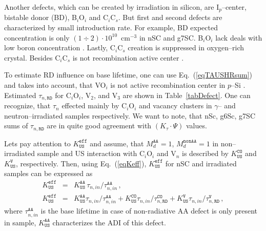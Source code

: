 \documentclass[aip,jap, amsmath,amssymb,reprint]{revtex4-1}
\begin{document}
Another defects, which can be created by irradiation in silicon, are I$_p$--center, bistable donor (BD), B$_i$O$_i$ and C$_i$C$_s$.
But first and second defects are characterized by small introduction rate.
For example, BD expected\cite{n:gamma,BD:Fret} concentration is only $(1\div2)\cdot10^{10}$~cm$^{-3}$ in nSC and g7SC.
B$_i$O$_i$ lack deals with low boron concentration \cite{SiIntDef}.
Lastly,  C$_i$C$_s$ creation is suppressed in oxygen--rich crystal\cite{gamma:Kolk,gamma:Stahl,n:long}.
Besides C$_i$C$_s$ is not recombination active center \cite{CiCs:Song}.

To estimate RD influence on base lifetime, one can use Eq.~(\ref{eqTAUSHRsum})
and takes into account, that
VO$_i$ is not active recombination center in $p$--Si \cite{gamma:Kolkov,IrrCzpSi:Benton,IrrCzpSi:Coffa,IrrCzpSi:Ganagona,IrrCzpSi:Vines}.
Estimated $\tau_{n,\mathtt{RD}}$ for C$_i$O$_i$, V$_2$, and  V$_3$ are shown in Table~\ref{tabDefect}.
One can recognize, that $\tau_n$ effected mainly by C$_i$O$_i$ and vacancy clusters in $\gamma$-- and neutron--irradiated samples respectively.
We want to note, that nSc, g6Sc, g7SC sums of $\tau_{n,\mathtt{RD}}$ are in quite good agreement with $(K_\tau\cdot\Psi)$ values.

Lets pay attention to $K_\mathtt{US}^\mathtt{eff}$ and assume, that
$M_d^\mathtt{AA}=1$, $M_d^\mathtt{nonAA}=1$ in non--irradiated sample and
US interaction with C$_i$O$_i$ and V$_n$ is described by $K_\mathtt{US}^\mathtt{CO}$ and $K_\mathtt{US}^\mathtt{V}$, respectively.
Then,
using Eq.~(\ref{eqKeff}),
$K_\mathtt{US}^\mathtt{eff}$ for nSC and irradiated samples
can be expressed as
\begin{eqnarray}
K_\mathtt{US}^\mathtt{eff}&=&K_\mathtt{US}^\mathtt{AA}\,\tau_{n,in}/\tau_{n,in}^\mathtt{AA}\,,\nonumber\\
K_\mathtt{US}^\mathtt{eff}&=&K_\mathtt{US}^\mathtt{AA}\tau_{n,in}/\tau_{n,in}^\mathtt{AA}+
                           K_\mathtt{US}^\mathtt{CO}\tau_{n,in}/\tau_{n,\mathtt{RD}}^\mathtt{CO}+
                           K_\mathtt{US}^\mathtt{V}\tau_{n,in}/\tau_{n,\mathtt{RD}}^\mathtt{V} \,,\nonumber
\end{eqnarray}
where
$\tau_{n,in}^\mathtt{AA}$ is the base lifetime in case of non-radiative AA defect is only present in sample,
$K_\mathtt{US}^\mathtt{AA}$ characterizes the ADI of this defect.
\end{document}
